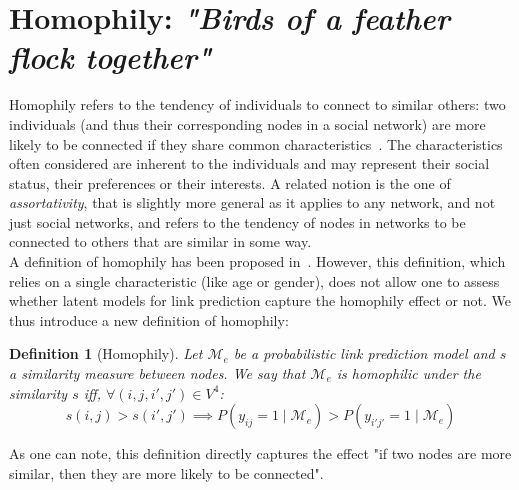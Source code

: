 \documentclass[conference]{IEEEtran}
\newcommand{\pr}{P}
\newtheorem{definition}{Definition}[section]
\begin{document}
\section{Homophily: \emph{"Birds of a feather flock together"}}
\label{sec:homophily}

Homophily refers to the tendency of individuals to connect to similar others: two individuals (and thus their corresponding nodes in a social network) are more likely to be connected if they share common characteristics~\cite{mcpherson2001birds,lazarsfeld1954friendship}. The characteristics often considered are inherent to the individuals and may represent their social status, their preferences or their interests. A related notion is the one of {\it assortativity}, that is slightly more general as it applies to any network, and not just social networks, and refers to the tendency of nodes in networks to be connected to others that are similar in some way.~\\

A definition of homophily has been proposed in~\cite{la2010randomization}. However, this definition, which relies on a single characteristic (like age or gender), does not allow one to assess whether latent models for link prediction capture the homophily effect or not. We thus introduce a new definition of homophily:~\\
%
\begin{definition}[Homophily] \label{def:homophily}
	Let $\mathcal{M}_e$ be a probabilistic link prediction model and $s$ a similarity measure between nodes. We say that $\mathcal{M}_e$ is homophilic under the similarity $s$ iff, $\forall (i,j,i',j') \in V^4$:
%
\begin{equation}
s(i,j) > s(i',j')  \implies \pr(y_{ij}=1 \mid \mathcal{M}_e) > \pr(y_{i'j'}=1  \mid \mathcal{M}_e) \nonumber
\end{equation}
%
\end{definition}
%
\noindent As one can note, this definition directly captures the effect "if two nodes are more similar, then they are more likely to be connected". ~\\
\end{document}
